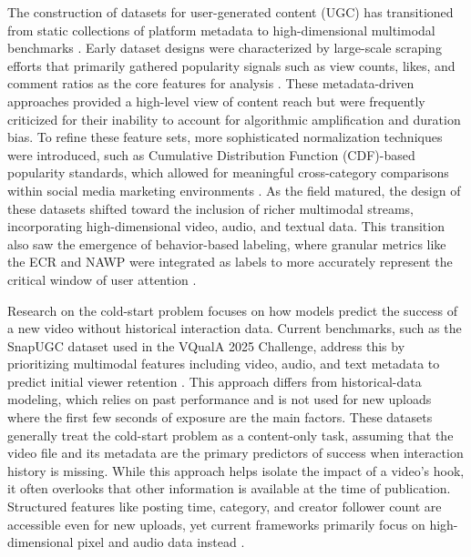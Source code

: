 The construction of datasets for user-generated content (UGC) has transitioned from static collections of platform metadata to high-dimensional multimodal benchmarks \cite{violot2024shorts, li2024delving, li2025vquala}. Early dataset designs were characterized by large-scale scraping efforts that primarily gathered popularity signals such as view counts, likes, and comment ratios as the core features for analysis \cite{violot2024shorts}. These metadata-driven approaches provided a high-level view of content reach but were frequently criticized for their inability to account for algorithmic amplification and duration bias. To refine these feature sets, more sophisticated normalization techniques were introduced, such as Cumulative Distribution Function (CDF)-based popularity standards, which allowed for meaningful cross-category comparisons within social media marketing environments \cite{cho2024amps}. As the field matured, the design of these datasets shifted toward the inclusion of richer multimodal streams, incorporating high-dimensional video, audio, and textual data. This transition also saw the emergence of behavior-based labeling, where granular metrics like the ECR and NAWP were integrated as labels to more accurately represent the critical window of user attention \cite{li2024delving, li2025vquala}.

Research on the cold-start problem focuses on how models predict the success of a new video without historical interaction data. Current benchmarks, such as the SnapUGC dataset used in the VQualA 2025 Challenge, address this by prioritizing multimodal features including video, audio, and text metadata to predict initial viewer retention \cite{li2025vquala}. This approach differs from historical-data modeling, which relies on past performance and is not used for new uploads where the first few seconds of exposure are the main factors. These datasets generally treat the cold-start problem as a content-only task, assuming that the video file and its metadata are the primary predictors of success when interaction history is missing. While this approach helps isolate the impact of a video's hook, it often overlooks that other information is available at the time of publication. Structured features like posting time, category, and creator follower count are accessible even for new uploads, yet current frameworks primarily focus on high-dimensional pixel and audio data instead \cite{ge2025lmm}.

